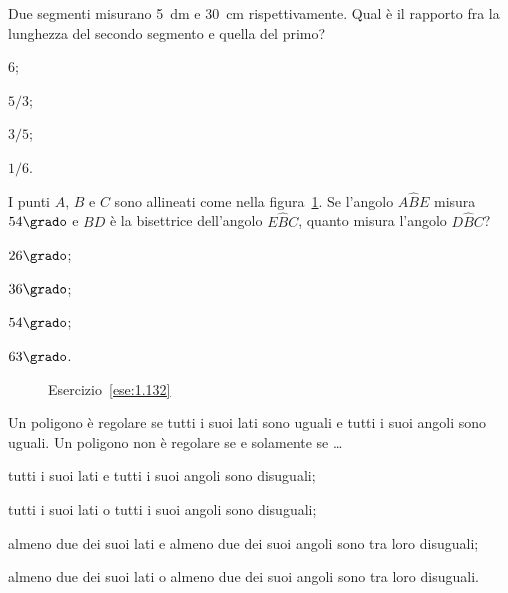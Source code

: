 \begin{esercizio}
\label{ese:1.131}
Due segmenti misurano 5~dm e 30~cm rispettivamente. Qual è il 
rapporto fra la lunghezza del secondo segmento e quella del primo?
\begin{multicols}{4}
\begin{enumeratea}
\item 6;
\item \(5/3\);
\item \(3/5\);
\item \(1/6\).
\end{enumeratea}
\end{multicols}
\end{esercizio}

\begin{esercizio}
\label{ese:1.132}
I punti \(A\), \(B\) e \(C\) sono allineati come nella 
figura~\ref{fig:ese1.132}. Se l'angolo \(A\widehat{B}E\) misura 
\(54\grado\) e \(BD\) è la bisettrice dell'angolo \(E\widehat{B}C\), quanto 
misura l'angolo \(D\widehat{B}C\)?
\begin{multicols}{4}
\begin{enumeratea}
\item \(26\grado\);
\item \(36\grado\);
\item \(54\grado\);
\item \(63\grado\).
\end{enumeratea}
\end{multicols}
\end{esercizio}


\begin{inaccessibleblock}
 \begin{figure}[htb]
 \centering
 \caption{Esercizio~\ref{ese:1.132}}\label{fig:ese1.132}
\end{figure}
\end{inaccessibleblock}


\begin{esercizio}
\label{ese:1.133}
Un poligono è regolare se tutti i suoi lati sono uguali e tutti i 
suoi angoli sono uguali. Un poligono non è regolare se e solamente se 
\ldots
\begin{enumeratea}
\item tutti i suoi lati e tutti i suoi angoli sono disuguali;
\item tutti i suoi lati o tutti i suoi angoli sono disuguali;
\item almeno due dei suoi lati e almeno due dei suoi angoli sono tra 
loro disuguali;
\item almeno due dei suoi lati o almeno due dei suoi angoli sono tra 
loro disuguali.
\end{enumeratea}
\end{esercizio}


